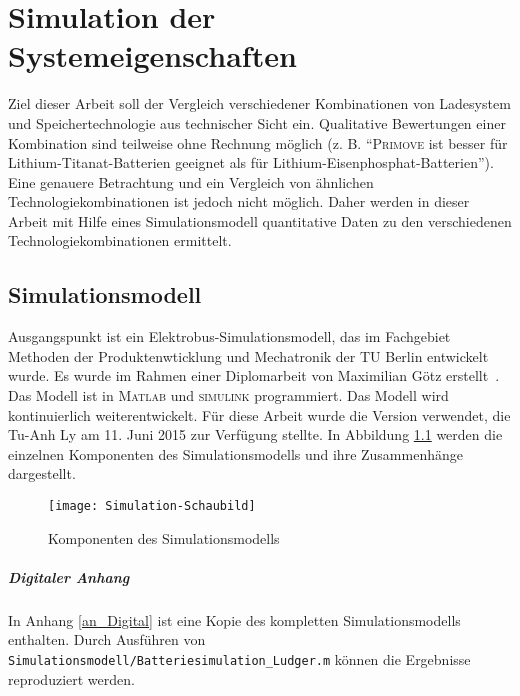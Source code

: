 \chapter{Simulation der Systemeigenschaften}
\label{chap4}
Ziel dieser Arbeit soll der Vergleich verschiedener Kombinationen von Ladesystem und Speichertechnologie aus technischer Sicht ein. Qualitative Bewertungen einer Kombination sind teilweise ohne Rechnung möglich (z. B. "`\textsc{Primove} ist besser für Lithium-Titanat-Batterien geeignet als für Lithium-Eisenphosphat-Batterien"'). Eine genauere Betrachtung und ein Vergleich von ähnlichen Technologiekombinationen ist jedoch nicht möglich. Daher werden in dieser Arbeit mit Hilfe eines Simulationsmodell quantitative Daten zu den verschiedenen Technologiekombinationen ermittelt.

\section{Simulationsmodell}
Ausgangspunkt ist ein Elektrobus-Simulationsmodell, das im Fachgebiet Methoden der Produktenwticklung und Mechatronik der TU Berlin entwickelt wurde. Es wurde im Rahmen einer Diplomarbeit von Maximilian Götz erstellt~\cite{Gotz:2013}. Das Modell ist in \textsc{Matlab} und \textsc{simulink} programmiert. Das Modell wird kontinuierlich weiterentwickelt. Für diese Arbeit wurde die Version verwendet, die Tu-Anh Ly am 11. Juni 2015 zur Verfügung stellte. In Abbildung \ref{abb_simmodell} werden die einzelnen Komponenten des Simulationsmodells und ihre Zusammenhänge dargestellt.
\begin{figure}\centering
	\texttt{[image: Simulation-Schaubild]}
	\caption{Komponenten des Simulationsmodells}
	\label{abb_simmodell}
\end{figure}

\paragraph{Digitaler Anhang} In Anhang \ref{an_Digital} ist eine Kopie des kompletten Simulationsmodells enthalten. Durch Ausführen von \texttt{Simulationsmodell/Batteriesimulation\_Ludger.m} können die Ergebnisse reproduziert werden.

